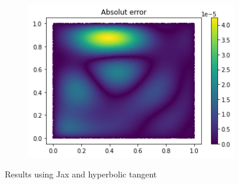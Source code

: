 \begin{figure}[H]
\begin{subfigure}{.45\textwidth}
    \label{fig:sub3}
    \end{subfigure}
\begin{subfigure}{.45\textwidth}
    \centering
    \includegraphics[width=.8\linewidth]{images/NN_Jax_PDE8_files_tanh/NN_Jax_PDE8_24_0.png}
    \label{fig:sub4}
\end{subfigure}
\caption{Results using Jax and hyperbolic tangent}
\label{fig:test}
\end{figure}

\newpage
